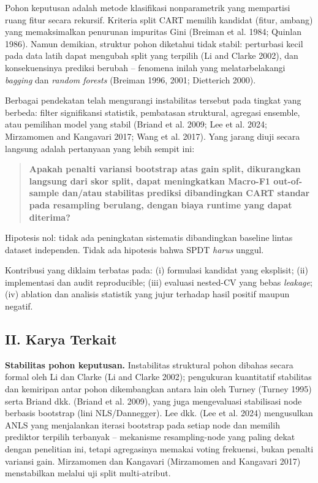 \documentclass[
  conference]{IEEEtran}
\begin{document}
Pohon keputusan adalah metode klasifikasi nonparametrik yang mempartisi
ruang fitur secara rekursif. Kriteria split CART memilih kandidat
(fitur, ambang) yang memaksimalkan penurunan impuritas Gini (Breiman et
al. 1984; Quinlan 1986). Namun demikian, struktur pohon diketahui tidak
stabil: perturbasi kecil pada data latih dapat mengubah split yang
terpilih (Li and Clarke 2002), dan konsekuensinya prediksi berubah --
fenomena inilah yang melatarbelakangi \emph{bagging} dan \emph{random
forests} (Breiman 1996, 2001; Dietterich 2000).

Berbagai pendekatan telah mengurangi instabilitas tersebut pada tingkat
yang berbeda: filter signifikansi statistik, pembatasan struktural,
agregasi ensemble, atau pemilihan model yang stabil (Briand et al. 2009;
Lee et al. 2024; Mirzamomen and Kangavari 2017; Wang et al. 2017). Yang
jarang diuji secara langsung adalah pertanyaan yang lebih sempit ini:

\begin{quote}
\textbf{Apakah penalti variansi bootstrap atas gain split, dikurangkan
langsung dari skor split, dapat meningkatkan Macro-F1 out-of-sample
dan/atau stabilitas prediksi dibandingkan CART standar pada resampling
berulang, dengan biaya runtime yang dapat diterima?}
\end{quote}

Hipotesis nol: tidak ada peningkatan sistematis dibandingkan baseline
lintas dataset independen. Tidak ada hipotesis bahwa SPDT \emph{harus}
unggul.

Kontribusi yang diklaim terbatas pada: (i) formulasi kandidat yang
eksplisit; (ii) implementasi dan audit reproducible; (iii) evaluasi
nested-CV yang bebas \emph{leakage}; (iv) ablation dan analisis
statistik yang jujur terhadap hasil positif maupun negatif.

\subsection{II. Karya Terkait}\label{ii.-karya-terkait}

\textbf{Stabilitas pohon keputusan.} Instabilitas struktural pohon
dibahas secara formal oleh Li dan Clarke (Li and Clarke 2002);
pengukuran kuantitatif stabilitas dan kemiripan antar pohon dikembangkan
antara lain oleh Turney (Turney 1995) serta Briand dkk. (Briand et al.
2009), yang juga mengevaluasi stabilisasi node berbasis bootstrap (lini
NLS/Dannegger). Lee dkk. (Lee et al. 2024) mengusulkan ANLS yang
menjalankan iterasi bootstrap pada setiap node dan memilih prediktor
terpilih terbanyak -- mekanisme resampling-node yang paling dekat dengan
penelitian ini, tetapi agregasinya memakai voting frekuensi, bukan
penalti variansi gain. Mirzamomen dan Kangavari (Mirzamomen and
Kangavari 2017) menstabilkan melalui uji split multi-atribut.
\end{document}
